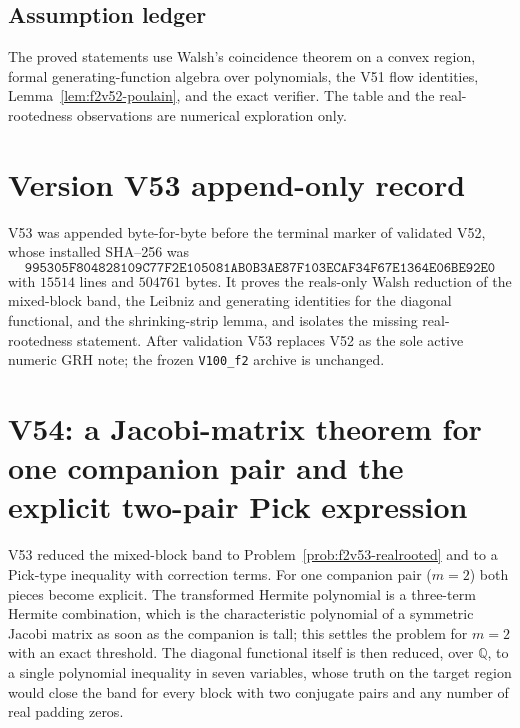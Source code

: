 \documentclass[11pt]{article}
\theoremstyle{definition}
\theoremstyle{remark}
\begin{document}
\subsection*{Assumption ledger}
\label{ass:f2v53}
The proved statements use Walsh's coincidence theorem on a convex
region, formal generating-function algebra over polynomials, the V51
flow identities, Lemma~\ref{lem:f2v52-poulain}, and the exact verifier.
The table and the real-rootedness observations are numerical
exploration only.
\endgroup

\section*{Version V53 append-only record}

V53 was appended byte-for-byte before the terminal marker of validated
V52, whose installed SHA--256 was
\[
 \texttt{995305F804828109C77F2E105081AB0B}
 \allowbreak\texttt{3AE87F103ECAF34F67E1364E06BE92E0}
\]
with \(15514\) lines and \(504761\) bytes.  It proves the reals-only
Walsh reduction of the mixed-block band, the Leibniz and generating
identities for the diagonal functional, and the shrinking-strip lemma,
and isolates the missing real-rootedness statement.  After validation
V53 replaces V52 as the sole active numeric GRH note; the frozen
\texttt{V100\_f2} archive is unchanged.





\clearpage
\section{V54: a Jacobi-matrix theorem for one companion pair and the explicit two-pair Pick expression}
\label{sec:f2v54-jacobi}
\begingroup
\setcounter{equation}{0}
\renewcommand{\theequation}{N54.\arabic{equation}}
\renewcommand{\theHequation}{f2v54.\arabic{equation}}

V53 reduced the mixed-block band to Problem~\ref{prob:f2v53-realrooted}
and to a Pick-type inequality with correction terms.  For one companion
pair (\(m=2\)) both pieces become explicit.  The transformed Hermite
polynomial is a three-term Hermite combination, which is the
characteristic polynomial of a symmetric Jacobi matrix as soon as the
companion is tall; this settles the problem for \(m=2\) with an exact
threshold.  The diagonal functional itself is then reduced, over
\(\mathbb Q\), to a single polynomial inequality in seven variables,
whose truth on the target region would close the band for every block
with two conjugate pairs and any number of real padding zeros.
\end{document}
